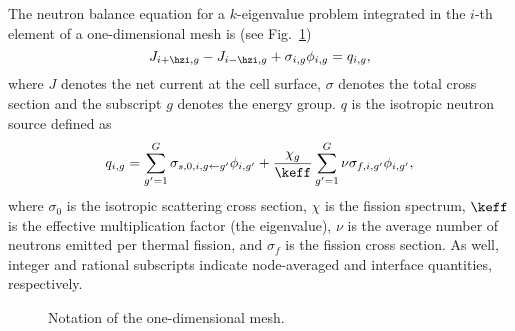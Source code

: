 The neutron balance equation for a $k$-eigenvalue problem integrated in the $i$-th element of a one-dimensional mesh is (see Fig.~\ref{fig:mesh1D})
\begin{equation}
  \label{eq:balance}
  J_{i+\hzi,g} - J_{i-\hzi,g} + \sigma_{i,g} \phi_{i,g} = q_{i,g},
\end{equation}
where $J$ denotes the net current at the cell surface, $\sigma$ denotes the total cross section and the subscript $g$ denotes the energy group. $q$ is the isotropic neutron source defined as
\begin{equation}
  \label{eq:qsrc}
  q_{i,g} = \sum\limits_{g'=1}^G\sigma_{s,0,i,g\leftarrow g'}\phi_{i,g'} +
  \frac{\chi_g}{\keff}\sum\limits_{g'=1}^G\nu\sigma_{f,i,g'}\phi_{i,g'},
\end{equation}
where $\sigma_0$ is the isotropic scattering cross section, $\chi$ is the fission spectrum, $\keff$ is the effective multiplication factor (the eigenvalue), $\nu$ is the average number of neutrons emitted per thermal fission, and $\sigma_f$ is the fission cross section. As well, integer and rational subscripts indicate node-averaged and interface quantities, respectively.
%
\begin{figure}[htbp]
	\centering
	\caption{Notation of the one-dimensional mesh.}
	\label{fig:mesh1D}
\end{figure}

